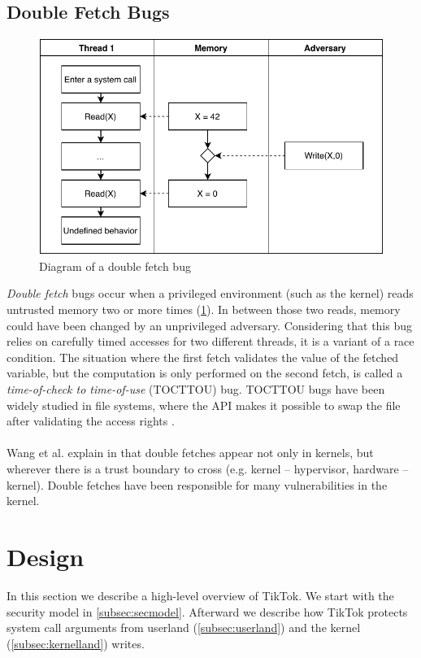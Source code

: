 \subsection{Double Fetch Bugs}

\label{subsec:doublefetch}

\begin{figure}[]
  \centering
  \includegraphics[width=.85\linewidth]{img/doublefetch.pdf}
  \caption{Diagram of a double fetch bug}
  \label{fig:doublefetch}
\end{figure}

\emph{Double fetch} bugs occur when a privileged environment (such as the 
kernel) reads untrusted memory two or more times (\cref{fig:doublefetch}). 
In between those two reads, memory could have been changed by an unprivileged
adversary. Considering that this bug relies on carefully timed accesses
for two different threads, it is a variant of a race condition. The situation
where the first fetch validates the value of the fetched variable, 
but the computation is only performed on the second fetch, is called a 
\emph{time-of-check to time-of-use} (TOCTTOU) bug. TOCTTOU bugs have been
widely studied in file systems, where the API makes it possible to swap the file
after validating the access rights \cite{payer2012protecting,
pu2006methodical, wei2010modeling, tsafrir2008portably}.
\\
\\
Wang et al. explain in \cite{wang2018survey} that double fetches appear not only
in kernels, but wherever there is a trust boundary to cross (e.g. kernel -- 
hypervisor, hardware -- kernel). Double fetches have been responsible for many
vulnerabilities in the kernel.


\section{Design}
\label{sec:design}
In this section we describe a high-level overview of TikTok. We start with the 
security model in \cref{subsec:secmodel}. Afterward we describe how TikTok 
protects system call arguments from userland (\cref{subsec:userland}) and the 
kernel (\cref{subsec:kernelland}) writes.


